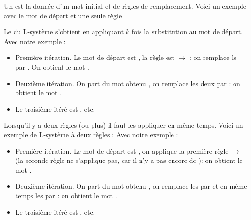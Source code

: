 \documentclass[11pt,class=report,crop=false]{standalone}
\begin{document}




\begin{cours}[L-système]
Un  est la donnée d'un mot initial et de règles de remplacement.
Voici un exemple avec le mot de départ et une seule règle : 


Le  du L-système s'obtient en appliquant $k$ fois la substitution au mot de départ.
Avec notre exemple :
\begin{itemize}
  \item Première itération. Le mot de départ est , la règle est  $\rightarrow$  : on remplace le  par . On obtient le mot .
  
  \item Deuxième itération. On part du mot obtenu , on remplace les deux  par  : on obtient le mot .
  
  \item Le troisième itéré est , etc.  
\end{itemize}

Lorsqu'il y a deux règles (ou plus) il faut les appliquer en même temps.
Voici un exemple de L-système à deux règles :
Avec notre exemple :
\begin{itemize}
  \item Première itération. Le mot de départ est , on applique la première règle  $\rightarrow$  (la seconde règle ne s'applique pas, car il n'y a pas encore de ): on obtient le mot .
  
  \item Deuxième itération. On part du mot obtenu , on remplace les  par  et en même temps les  par  : on obtient le mot .
  
  \item Le troisième itéré est , etc.  
\end{itemize}

\end{cours}
\end{document}
